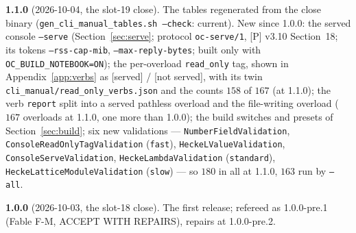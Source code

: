\documentclass[11pt,openany]{report}
\newcommand{\cli}[1]{\texttt{#1}}
\newcommand{\file}[1]{\nolinkurl{#1}}
\newcommand{\vb}[1]{\texttt{#1}}
\begin{document}
\textbf{1.1.0} (2026-10-04, the slot-19 close). The tables regenerated from the close binary
(\texttt{gen\_cli\_manual\_tables.sh --check}: current). New since 1.0.0: the served console \cli{--serve}
(Section~\ref{sec:serve}; protocol \texttt{oc-serve/1}, [P] v3.10 Section~18; its tokens \cli{--rss-cap-mib},
\cli{--max-reply-bytes}; built only with \texttt{OC\_BUILD\_NOTEBOOK=ON}); the per-overload \texttt{read\_only}
tag, shown in Appendix~\ref{app:verbs} as \textsf{[served]} / \textsf{[not served]}, with its twin
\file{cli_manual/read_only_verbs.json} and the counts $158$ of $167$ (at 1.1.0); the verb
\vb{report} split into a served pathless overload and the file-writing overload ($167$
overloads at 1.1.0, one more than 1.0.0); the build switches and presets of Section~\ref{sec:build}; six new
validations --- \vb{NumberFieldValidation}, \vb{ConsoleReadOnlyTagValidation} (\texttt{fast}),
\vb{HeckeLValueValidation}, \vb{ConsoleServeValidation}, \vb{HeckeLambdaValidation} (\texttt{standard}),
\vb{HeckeLatticeModuleValidation} (\texttt{slow}) --- so $180$ in all at 1.1.0, $163$ run by \cli{--all}.

\textbf{1.0.0} (2026-10-03, the slot-18 close). The first release; refereed as 1.0.0-pre.1 (Fable F-M, ACCEPT WITH
REPAIRS), repairs at 1.0.0-pre.2.

\clearpage
{}
\printindex
\end{document}
